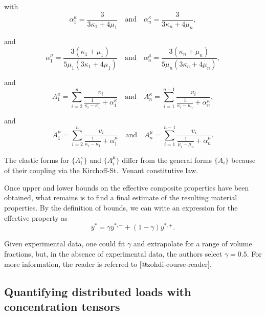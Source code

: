 with \begin{equation}\label{eqn:bulk_alphas}
\alpha_{1}^{\kappa} = \frac{3}{3\kappa_{1} + 4\mu_{1}}
\quad \text{and} \quad
\alpha_{n}^{\kappa} = \frac{3}{3\kappa_{n} + 4\mu_{n}},
\end{equation}

and \begin{equation}\label{eqn:shear_alphas}
\alpha_{1}^{\mu} = \frac{3(\kappa_{1} + \mu_{1})}{5\mu_{1}(3\kappa_{1} + 4\mu_{1})}
\quad \text{and} \quad
\alpha_{n}^{\mu} = \frac{3(\kappa_{n} + \mu_{n})}{5\mu_{n}(3\kappa_{n} + 4\mu_{n})},
\end{equation}

and \begin{equation}\label{eqn:bulk_As}
A_{1}^{\kappa} = \sum\limits_{i=2}^{n} \frac{v_{i}}{\frac{1}{\kappa_{i} - \kappa_{1}} + \alpha_{1}^{\kappa}}
\quad \text{and} \quad
A_{n}^{\kappa} = \sum\limits_{i=1}^{n-1} \frac{v_{i}}{\frac{1}{\kappa_{i} - \kappa_{n}} + \alpha_{n}^{\kappa}}, 
\end{equation}

and \begin{equation}\label{eqn:shear_As}
A_{1}^{\mu} = \sum\limits_{i=2}^{n} \frac{v_{i}}{\frac{1}{\kappa_{i} - \kappa_{1}} + \alpha_{1}^{\mu}}
\quad \text{and} \quad
A_{n}^{\mu} = \sum\limits_{i=1}^{n-1} \frac{v_{i}}{\frac{1}{\mu_{i} - \mu_{n}} + \alpha_{n}^{\mu}}.
\end{equation}

The elastic forms for \(\{A_{i}^{\kappa}\}\) and \(\{A_{i}^{\mu}\}\)
differ from the general forms \(\{A_{i}\}\) because of their coupling
via the Kirchoff-St.~Venant constitutive law.

Once upper and lower bounds on the effective composite properties have
been obtained, what remains is to find a final estimate of the resulting
material properties. By the definition of bounds, we can write an
expression for the effective property as
\begin{equation}\label{eqn:mixing-param}
y^{*} = \gamma y^{*,-} + (1-\gamma) y^{*,+}.
\end{equation}

Given experimental data, one could fit \(\gamma\) and extrapolate for a
range of volume fractions, but, in the absence of experimental data, the
authors select \(\gamma = 0.5\). For more information, the reader is
referred to {[}@zohdi-course-reader{]}.

\subsection{Quantifying distributed loads with concentration
tensors}\label{quantifying-distributed-loads-with-concentration-tensors}

